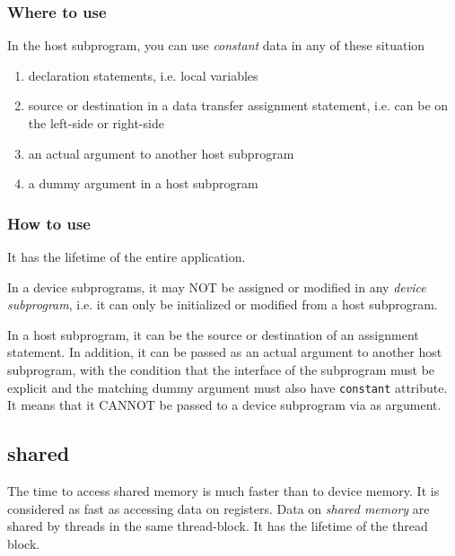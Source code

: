 \subsubsection{Where to use}
\label{sec:where-use-1}

In the host subprogram, you can use {\it constant} data in any of
these situation
\begin{enumerate}
\item declaration statements, i.e. local variables
\item source or destination in a data transfer assignment statement,
  i.e. can be on the left-side or right-side
\item an actual argument to another host subprogram
\item a dummy argument in a host subprogram 
\end{enumerate}

\subsubsection{How to use}
\label{sec:how-use-2}

It has the lifetime of the entire application.

In a device subprograms, it may NOT be assigned or modified in any
{\it device subprogram}, i.e. it can only be initialized or modified
from a host subprogram.

In a host subprogram, it can be the source or destination of an
assignment statement. In addition, it can be passed as an actual
argument to another host subprogram, with the condition that the
interface of the subprogram must be explicit and the matching dummy
argument must also have \verb!constant! attribute. It means that it
CANNOT be passed to a device subprogram via as argument. 

\subsection{shared}
\label{sec:shared}

The time to access shared memory is much faster than to device
memory. It is considered as fast as accessing data on registers.  Data
on {\it shared memory} are shared by threads in the same thread-block.
It has the lifetime of the thread block.

